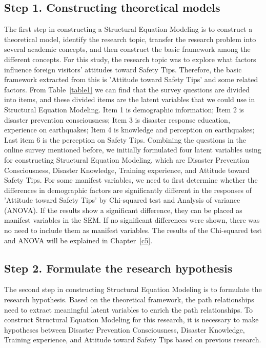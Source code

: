 \subsection{Step 1. Constructing theoretical models}
The first step in constructing a Structural Equation Modeling is to construct a theoretical model, identify the research topic, transfer the research problem into several academic concepts, and then construct the basic framework among the different concepts. For this study, the research topic was to explore what factors influence foreign visitors' attitudes toward Safety Tips. Therefore, the basic framework extracted from this is 'Attitude toward Safety Tips' and some related factors. From Table~\ref{table1} we can find that the survey questions are divided into items, and these divided items are the latent variables that we could use in Structural Equation Modeling. Item 1 is demographic information; Item 2 is disaster prevention consciousness; Item 3 is disaster response education, experience on earthquakes; Item 4 is knowledge and perception on earthquakes; Last item 6 is the perception on Safety Tips. Combining the questions in the online survey mentioned before, we initially formulated four latent variables using for constructing Structural Equation Modeling, which are Disaster Prevention Consciousness, Disaster Knowledge, Training experience, and Attitude toward Safety Tips. For some manifest variables, we need to first determine whether the differences in demographic factors are significantly different in the responses of 'Attitude toward Safety Tips' by Chi-squared test and Analysis of variance (ANOVA). If the results show a significant difference, they can be placed as manifest variables in the SEM. If no significant differences were shown, there was no need to include them as manifest variables. The results of the Chi-squared test and ANOVA will be explained in Chapter~\ref{c5}. 


\subsection{Step 2. Formulate the research hypothesis}
The second step in constructing Structural Equation Modeling is to formulate the research hypothesis. Based on the theoretical framework, the path relationships need to extract meaningful latent variables to enrich the path relationships. To construct Structural Equation Modeling for this research, it is necessary to make hypotheses between Disaster Prevention Consciousness, Disaster Knowledge, Training experience, and Attitude toward Safety Tips based on previous research. 

